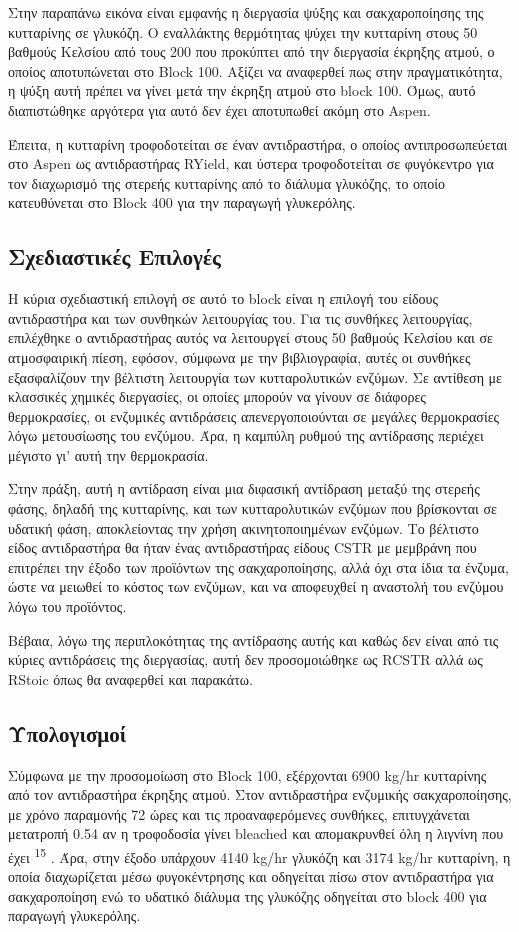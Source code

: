 \documentclass[11pt]{article}
\makeatletter
\newcommand{\citeprocitem}[2]{\hyper@linkstart{cite}{citeproc_bib_item_#1}#2\hyper@linkend}
\makeatother
\begin{document}
Στην παραπάνω εικόνα είναι εμφανής η διεργασία ψύξης και σακχαροποίησης
της κυτταρίνης σε γλυκόζη. Ο εναλλάκτης θερμότητας ψύχει την κυτταρίνη
στους 50 βαθμούς Κελσίου από τους 200 που προκύπτει από την διεργασία
έκρηξης ατμού, ο οποίος αποτυπώνεται στο Block 100. Αξίζει να αναφερθεί πως στην πραγματικότητα, η ψύξη αυτή πρέπει να γίνει μετά την έκρηξη ατμού στο block 100. Όμως, αυτό διαπιστώθηκε αργότερα για αυτό δεν έχει αποτυπωθεί ακόμη στο Aspen.

Έπειτα, η κυτταρίνη τροφοδοτείται σε έναν αντιδραστήρα, ο οποίος αντιπροσωπεύεται στο Aspen ως αντιδραστήρας RYield, και ύστερα τροφοδοτείται σε φυγόκεντρο για τον
διαχωρισμό της στερεής κυτταρίνης από το διάλυμα γλυκόζης, το οποίο
κατευθύνεται στο Block 400 για την παραγωγή γλυκερόλης.

\subsection{Σχεδιαστικές Επιλογές}
\label{sec:org7134709}
Η κύρια σχεδιαστική επιλογή σε αυτό το block είναι η επιλογή του είδους
αντιδραστήρα και των συνθηκών λειτουργίας του. Για τις συνθήκες
λειτουργίας, επιλέχθηκε ο αντιδραστήρας αυτός να λειτουργεί στους 50
βαθμούς Κελσίου και σε ατμοσφαιρική πίεση, εφόσον, σύμφωνα με την
βιβλιογραφία, αυτές οι συνθήκες εξασφαλίζουν την βέλτιστη λειτουργία των
κυτταρολυτικών ενζύμων. Σε αντίθεση με κλασσικές χημικές διεργασίες, οι
οποίες μπορούν να γίνουν σε διάφορες θερμοκρασίες, οι ενζυμικές
αντιδράσεις απενεργοποιούνται σε μεγάλες θερμοκρασίες λόγω μετουσίωσης
του ενζύμου. Άρα, η καμπύλη ρυθμού της αντίδρασης περιέχει μέγιστο γι'
αυτή την θερμοκρασία.

Στην πράξη, αυτή η αντίδραση είναι μια διφασική αντίδραση μεταξύ της
στερεής φάσης, δηλαδή της κυτταρίνης, και των κυτταρολυτικών ενζύμων που
βρίσκονται σε υδατική φάση, αποκλείοντας την χρήση ακινητοποιημένων
ενζύμων. Το βέλτιστο είδος αντιδραστήρα θα ήταν ένας αντιδραστήρας
είδους CSTR με μεμβράνη που επιτρέπει την έξοδο των προϊόντων της
σακχαροποίησης, αλλά όχι στα ίδια τα ένζυμα, ώστε να μειωθεί το κόστος
των ενζύμων, και να αποφευχθεί η αναστολή του ενζύμου λόγω του
προϊόντος.

Βέβαια, λόγω της περιπλοκότητας της αντίδρασης αυτής και καθώς δεν είναι από τις κύριες αντιδράσεις της διεργασίας, αυτή δεν προσομοιώθηκε ως RCSTR αλλά ως RStoic όπως θα αναφερθεί και παρακάτω.

\subsection{Υπολογισμοί}
\label{sec:orgf9b0ba7}
Σύμφωνα με την προσομοίωση στο Block 100, εξέρχονται 6900 kg/hr
κυτταρίνης από τον αντιδραστήρα έκρηξης ατμού. Στον αντιδραστήρα
ενζυμικής σακχαροποίησης, με χρόνο παραμονής 72 ώρες και τις προαναφερόμενες συνθήκες, επιτυγχάνεται μετατροπή 0.54 αν η τροφοδοσία γίνει bleached και απομακρυνθεί όλη η λιγνίνη που έχει \textsuperscript{\citeprocitem{15}{15}} . Άρα, στην έξοδο
υπάρχουν 4140 kg/hr γλυκόζη και 3174 kg/hr κυτταρίνη, η οποία διαχωρίζεται
μέσω φυγοκέντρησης και οδηγείται πίσω στον αντιδραστήρα για
σακχαροποίηση ενώ το υδατικό διάλυμα της γλυκόζης οδηγείται στο block 400 για παραγωγή γλυκερόλης.
\end{document}
